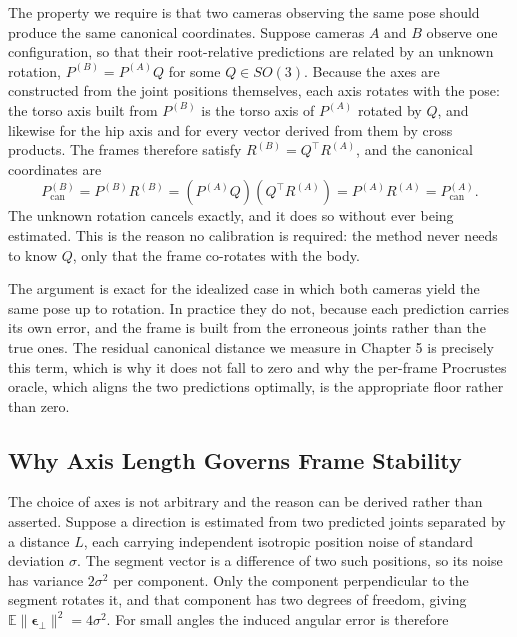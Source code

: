 \documentclass[12pt,a4paper]{report}
\begin{document}
The property we require is that two cameras observing the same pose should produce the same canonical coordinates. Suppose cameras $A$ and $B$ observe one configuration, so that their root-relative predictions are related by an unknown rotation, $P^{(B)} = P^{(A)} Q$ for some $Q \in SO(3)$. Because the axes are constructed from the joint positions themselves, each axis rotates with the pose: the torso axis built from $P^{(B)}$ is the torso axis of $P^{(A)}$ rotated by $Q$, and likewise for the hip axis and for every vector derived from them by cross products. The frames therefore satisfy $R^{(B)} = Q^{\!\top} R^{(A)}$, and the canonical coordinates are
\begin{equation}
P^{(B)}_{\text{can}} = P^{(B)} R^{(B)} = \left(P^{(A)} Q\right)\left(Q^{\!\top} R^{(A)}\right) = P^{(A)} R^{(A)} = P^{(A)}_{\text{can}} .
\end{equation}
The unknown rotation cancels exactly, and it does so without ever being estimated. This is the reason no calibration is required: the method never needs to know $Q$, only that the frame co-rotates with the body.

The argument is exact for the idealized case in which both cameras yield the same pose up to rotation. In practice they do not, because each prediction carries its own error, and the frame is built from the erroneous joints rather than the true ones. The residual canonical distance we measure in Chapter 5 is precisely this term, which is why it does not fall to zero and why the per-frame Procrustes oracle, which aligns the two predictions optimally, is the appropriate floor rather than zero.

\subsection{Why Axis Length Governs Frame Stability}
\label{sec:axistheory}

The choice of axes is not arbitrary and the reason can be derived rather than asserted. Suppose a direction is estimated from two predicted joints separated by a distance $L$, each carrying independent isotropic position noise of standard deviation $\sigma$. The segment vector is a difference of two such positions, so its noise has variance $2\sigma^2$ per component. Only the component perpendicular to the segment rotates it, and that component has two degrees of freedom, giving $\mathbb{E}\lVert \boldsymbol{\epsilon}_{\perp}\rVert^2 = 4\sigma^2$. For small angles the induced angular error is therefore
\end{document}
